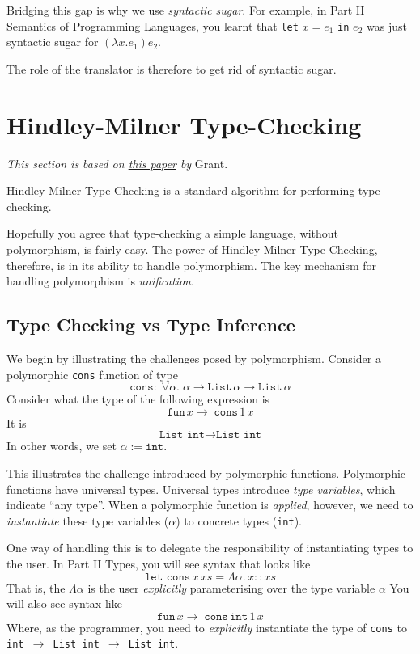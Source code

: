 {Bridging this gap is why we use \textit{syntactic sugar}. For example, in \textsf{Part II Semantics of Programming Languages}, you learnt that \texttt{let} $x = e_1$ \texttt{in} $e_2$ was just syntactic sugar for $(\lambda x. e_1) e_2$.

The role of the translator is therefore to get rid of syntactic sugar. 

\section{Hindley-Milner Type-Checking\optional}\label{section:hm-type-checking}
\textit{This section is based on \href{https://steshaw.org/hm/hindley-milner.pdf}{this paper} by} Grant.

Hindley-Milner Type Checking is a standard algorithm for performing type-checking. 

Hopefully you agree that type-checking a simple language, without polymorphism, is fairly easy. The power of Hindley-Milner Type Checking, therefore, is in its ability to handle polymorphism. The key mechanism for handling polymorphism is \textit{unification}.

\subsection{Type Checking vs Type Inference}
We begin by illustrating the challenges posed by polymorphism. Consider a polymorphic \texttt{cons} function of type
\[\texttt{cons}: \; \forall \alpha. \; \alpha \to \texttt{List} \, \alpha \to \texttt{List} \, \alpha\]
Consider what the type of the following expression is
\[\texttt{fun} \, x \rightarrow \; \texttt{cons} \, 1 \, x \]
It is
\[\texttt{List int} \rightarrow \texttt{List int}\]
In other words, we set $\alpha := \texttt{int}$.

This illustrates the challenge introduced by polymorphic functions. Polymorphic functions have universal types. Universal types introduce \textit{type variables}, which indicate ``any type''. When a polymorphic function is \textit{applied}, however, we need to \textit{instantiate} these type variables ($\alpha$) to concrete types (\texttt{int}). 

One way of handling this is to delegate the responsibility of instantiating types to the user. In \textsf{Part II Types}, you will see syntax that looks like
\[\texttt{let cons} \, x \, xs = \Lambda \alpha . \, x :: xs \]
That is, the $\Lambda \alpha$ is the user \textit{explicitly} parameterising over the type variable $\alpha$
You will also see syntax like
\[\texttt{fun} \, x \rightarrow \; \texttt{cons} \, \texttt{int} \, 1 \, x \]
Where, as the programmer, you need to \textit{explicitly} instantiate the type of \texttt{cons} to \texttt{int $\rightarrow$ List int $\rightarrow$ List int}. 

}
